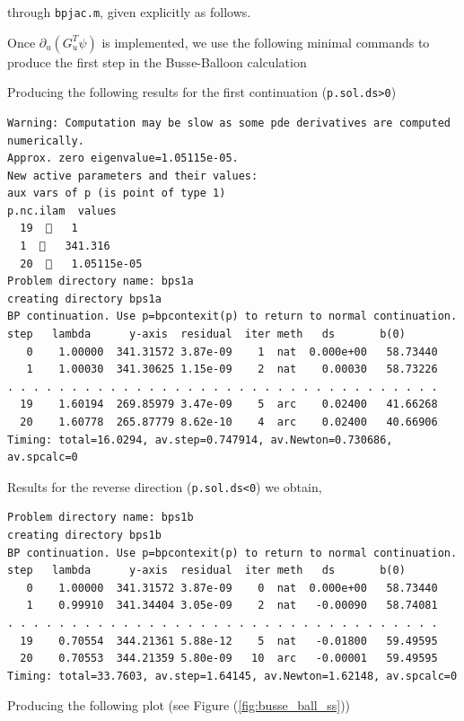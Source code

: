 \documentclass[a4paper,12pt]{article}
\begin{document}
% 
through {\tt bpjac.m}, given explicitly as follows.

Once $\partial_u (G_u^T \psi)$ is implemented, we use the following minimal commands to produce the first step in the Busse-Balloon calculation

Producing the following results for the first continuation ({\tt p.sol.ds>0})
\begin{verbatim}
Warning: Computation may be slow as some pde derivatives are computed numerically.
Approx. zero eigenvalue=1.05115e-05.
New active parameters and their values:
aux vars of p (is point of type 1)
p.nc.ilam  values
  19     1 
  1     341.316 
  20     1.05115e-05 
Problem directory name: bps1a
creating directory bps1a
BP continuation. Use p=bpcontexit(p) to return to normal continuation.
step   lambda      y-axis  residual  iter meth   ds       b(0)       
   0    1.00000  341.31572 3.87e-09    1  nat  0.000e+00   58.73440 
   1    1.00030  341.30625 1.15e-09    2  nat    0.00030   58.73226 
. . . . . . . . . . . . . . . . . . . . . . . . . . . . . . . . . .
  19    1.60194  269.85979 3.47e-09    5  arc    0.02400   41.66268 
  20    1.60778  265.87779 8.62e-10    4  arc    0.02400   40.66906 
Timing: total=16.0294, av.step=0.747914, av.Newton=0.730686, av.spcalc=0
\end{verbatim}
Results for the reverse direction ({\tt p.sol.ds<0}) we obtain,
\begin{verbatim}
Problem directory name: bps1b
creating directory bps1b
BP continuation. Use p=bpcontexit(p) to return to normal continuation.
step   lambda      y-axis  residual  iter meth   ds       b(0)       
   0    1.00000  341.31572 3.87e-09    0  nat  0.000e+00   58.73440 
   1    0.99910  341.34404 3.05e-09    2  nat   -0.00090   58.74081 
. . . . . . . . . . . . . . . . . . . . . . . . . . . . . . . . . . 
  19    0.70554  344.21361 5.88e-12    5  nat   -0.01800   59.49595 
  20    0.70553  344.21359 5.80e-09   10  arc   -0.00001   59.49595 
Timing: total=33.7603, av.step=1.64145, av.Newton=1.62148, av.spcalc=0
\end{verbatim}
Producing the following plot (see Figure (\ref{fig:busse_ball_ss}))
\end{document}
